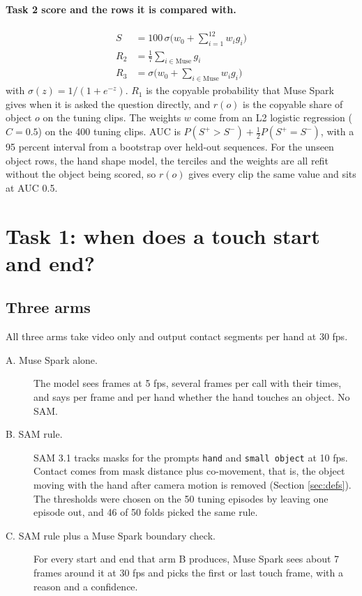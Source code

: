 \documentclass[10pt,twocolumn,letterpaper]{article}
\begin{document}
\paragraph{Task 2 score and the rows it is compared with.}
\begin{align}
S &= 100\,\sigma\Big(w_0 + \textstyle\sum_{i=1}^{12} w_i g_i\Big)\\
R_2 &= \textstyle\frac{1}{7}\sum_{i \in \mathrm{Muse}} g_i \\
R_3 &= \sigma\Big(w_0 + \textstyle\sum_{i \in \mathrm{Muse}} w_i g_i\Big)
\end{align}
with $\sigma(z) = 1/(1 + e^{-z})$. $R_1$ is the copyable probability that Muse
Spark gives when it is asked the question directly, and $r(o)$ is the copyable
share of object $o$ on the tuning clips. The weights $w$ come from an L2
logistic regression ($C = 0.5$) on the 400 tuning clips. AUC is
$P(S^+ > S^-) + \tfrac{1}{2}P(S^+ = S^-)$, with a 95 percent interval from a
bootstrap over held-out sequences. For the unseen object rows, the hand shape
model, the terciles and the weights are all refit without the object being
scored, so $r(o)$ gives every clip the same value and sits at AUC 0.5.

\section{Task 1: when does a touch start and end?}
\label{sec:num1}

\subsection{Three arms}

All three arms take video only and output contact segments per hand at 30 fps.

\begin{description}
\item[A. Muse Spark alone.] The model sees frames at 5 fps, several frames per
call with their times, and says per frame and per hand whether the hand
touches an object. No SAM.
\item[B. SAM rule.] SAM 3.1 tracks masks for the prompts \texttt{hand} and
\texttt{small object} at 10 fps. Contact comes from mask distance plus
co-movement, that is, the object moving with the hand after camera motion is
removed (Section \ref{sec:defs}). The thresholds were chosen on the 50 tuning
episodes by leaving one episode out, and 46 of 50 folds picked the same rule.
\item[C. SAM rule plus a Muse Spark boundary check.] For every start and end
that arm B produces, Muse Spark sees about 7 frames around it at 30 fps and
picks the first or last touch frame, with a reason and a confidence.
\end{description}
\end{document}
